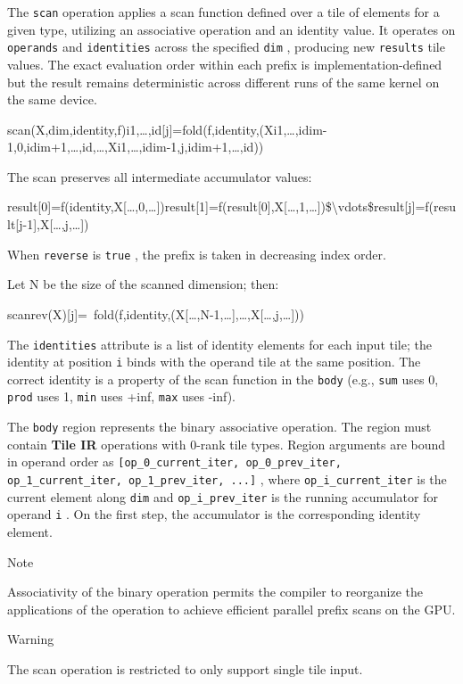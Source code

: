 \documentclass{article}
\begin{document}
The \texttt{scan} operation applies a scan function defined over a tile of elements for a given type, utilizing an associative operation and an identity value. It operates on \texttt{operands} and \texttt{identities} across the specified \texttt{dim} , producing new \texttt{results} tile values. The exact evaluation order within each prefix is implementation-defined but the result remains deterministic across different runs of the same kernel on the same device.


scan(X,dim,identity,f)i1,…,id[j]=fold(f,identity,(Xi1,…,idim-1,0,idim+1,…,id,…,Xi1,…,idim-1,j,idim+1,…,id))

The scan preserves all intermediate accumulator values:


result[0]=f(identity,X[…,0,…])result[1]=f(result[0],X[…,1,…])\$\textbackslash{}vdots\$result[j]=f(result[j-1],X[…,j,…])

When \texttt{reverse} is \texttt{true} , the prefix is taken in decreasing index order.

Let N be the size of the scanned dimension; then:


scanrev(X)[j]= fold(f,identity,(X[…,N-1,…],…,X[…,j,…]))

The \texttt{identities} attribute is a list of identity elements for each input tile; the identity at position \texttt{i} binds with the operand tile at the same position. The correct identity is a property of the scan function in the \texttt{body} (e.g., \texttt{sum} uses 0, \texttt{prod} uses 1, \texttt{min} uses +inf, \texttt{max} uses -inf).


The \texttt{body} region represents the binary associative operation. The region must contain \textbf{Tile IR} operations with 0-rank tile types. Region arguments are bound in operand order as \texttt{[op\_0\_current\_iter, op\_0\_prev\_iter, op\_1\_current\_iter, op\_1\_prev\_iter, ...]} , where \texttt{op\_i\_current\_iter} is the current element along \texttt{dim} and \texttt{op\_i\_prev\_iter} is the running accumulator for operand \texttt{i} . On the first step, the accumulator is the corresponding identity element.


Note


Associativity of the binary operation permits the compiler to reorganize the applications of the operation to achieve efficient parallel prefix scans on the GPU.



Warning


The scan operation is restricted to only support single tile input.
\end{document}
